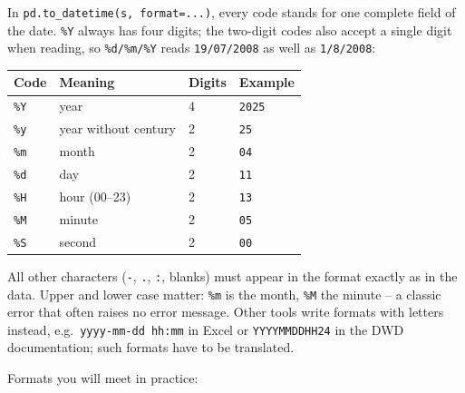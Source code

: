 \documentclass[
  letterpaper,
  DIV=11,
  numbers=noendperiod]{scrreprt}
\begin{document}
\begin{tcolorbox}[enhanced jigsaw, left=2mm, title=\textcolor{quarto-callout-tip-color}{\faLightbulb}\hspace{0.5em}{Format codes for time stamps}, opacityback=0, breakable, rightrule=.15mm, arc=.35mm, toptitle=1mm, colbacktitle=quarto-callout-tip-color!10!white, opacitybacktitle=0.6, coltitle=black, colframe=quarto-callout-tip-color-frame, bottomrule=.15mm, leftrule=.75mm, bottomtitle=1mm, titlerule=0mm, toprule=.15mm, colback=white]

In \texttt{pd.to\_datetime(s,\ format=...)}, every code stands for one
complete field of the date. \texttt{\%Y} always has four digits; the
two-digit codes also accept a single digit when reading, so
\texttt{\%d/\%m/\%Y} reads \texttt{19/07/2008} as well as
\texttt{1/8/2008}:

\begin{longtable}[]{@{}llll@{}}
\toprule\noalign{}
Code & Meaning & Digits & Example \\
\midrule\noalign{}
\endhead
\bottomrule\noalign{}
\endlastfoot
\texttt{\%Y} & year & 4 & \texttt{2025} \\
\texttt{\%y} & year without century & 2 & \texttt{25} \\
\texttt{\%m} & month & 2 & \texttt{04} \\
\texttt{\%d} & day & 2 & \texttt{11} \\
\texttt{\%H} & hour (00--23) & 2 & \texttt{13} \\
\texttt{\%M} & minute & 2 & \texttt{05} \\
\texttt{\%S} & second & 2 & \texttt{00} \\
\end{longtable}

All other characters (\texttt{-}, \texttt{.}, \texttt{:}, blanks) must
appear in the format exactly as in the data. Upper and lower case
matter: \texttt{\%m} is the month, \texttt{\%M} the minute -- a classic
error that often raises no error message. Other tools write formats with
letters instead, e.g.~\texttt{yyyy-mm-dd\ hh:mm} in Excel or
\texttt{YYYYMMDDHH24} in the DWD documentation; such formats have to be
translated.

Formats you will meet in practice:


\end{tcolorbox}
\end{document}
